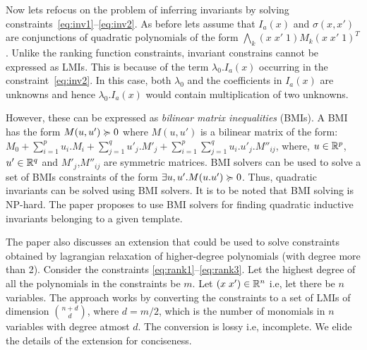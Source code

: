 Now lets refocus on the problem of inferring invariants by solving constraints~\ref{eq:inv1}--\ref{eq:inv2}. As before lets assume that
$I_a(x)$ and $\sigma(x,x')$ are conjunctions of quadratic polynomials 
of the form $\bigwedge_k (x \; x' \; 1) M_k (x \; x' \; 1)^T$.
Unlike the ranking function constraints, invariant constrains cannot be 
expressed as LMIs. This is because of the term $\lambda_0.I_a(x)$ occurring
in the constraint~\ref{eq:inv2}. In this case, both $\lambda_0$ and the 
coefficients in $I_a(x)$ are unknowns and hence $\lambda_0.I_a(x)$ would contain
multiplication of two unknowns. 

However, these can be expressed as \emph{bilinear matrix inequalities} (BMIs). A BMI has the form $M(u,u') \succcurlyeq 0$ where $M(u,u')$
is a bilinear matrix of the form: 
$M_0 + \sum \limits_{i=1}^{p} u_i.M_i + \sum \limits_{j=1}^{q} u'_j.M'_j + \sum \limits_{i=1}^{p} \sum \limits_{j=1}^{q} u_i.u'_j.M''_{ij}$,
where, $u \in \mathbb{R}^p$, $u' \in \mathbb{R}^q$ and $M'_j$,$M''_{ij}$ are symmetric matrices. BMI solvers can be used to solve a set of BMIs constraints  of the form $\exists u,u'. M(u.u') \succcurlyeq 0$. Thus, quadratic invariants can be solved using BMI solvers. It is to be noted that BMI solving is NP-hard. The paper proposes
to use BMI solvers for finding quadratic inductive invariants belonging to a given template.

The paper also discusses an extension that could be used to solve constraints obtained by lagrangian relaxation of higher-degree polynomials (with degree more than 2). Consider the constraints \ref{eq:rank1}--\ref{eq:rank3}. Let the highest degree of all the polynomials in the constraints be $m$. Let $(x \; x') \in \mathbb{R}^n$ i.e, let there be $n$ variables. The approach works by converting the constraints to a set of LMIs of dimension ${ n+ d \choose d}$, where $d = m/2$, which is the number of monomials in $n$ variables with degree atmost $d$. The conversion is lossy i.e, incomplete. We elide the details of the extension for conciseness.

